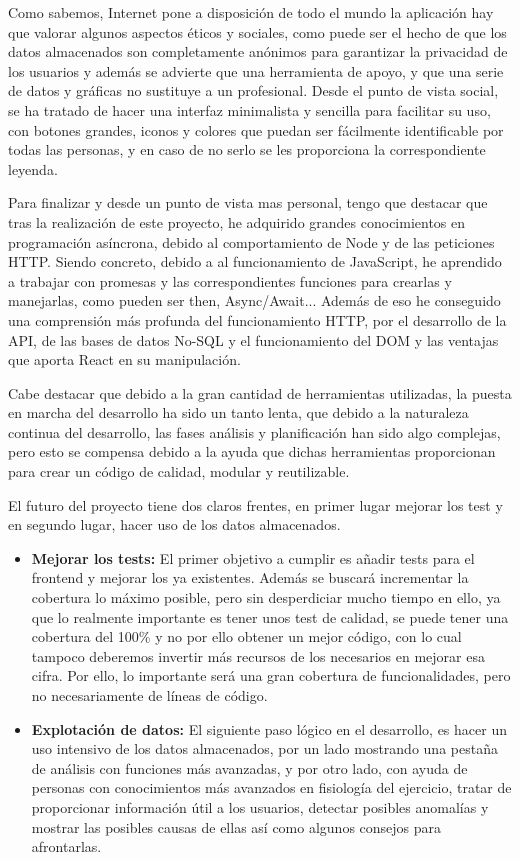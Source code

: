 Como sabemos, Internet pone a disposición de todo el mundo la aplicación hay que valorar algunos aspectos éticos y sociales, como puede ser el hecho de que los datos almacenados son completamente anónimos para garantizar la privacidad de los usuarios y además se advierte que una herramienta de apoyo, y que una serie de datos y gráficas no sustituye a un profesional. Desde el punto de vista social, se ha tratado de hacer una interfaz minimalista y sencilla para facilitar su uso, con botones grandes, iconos y colores que puedan ser fácilmente identificable por todas las personas, y en caso de no serlo se les proporciona la correspondiente leyenda.


Para finalizar y desde un punto de vista mas personal, tengo que destacar que tras la realización de este proyecto, he adquirido grandes conocimientos en programación asíncrona, debido al comportamiento de Node y de las peticiones HTTP. Siendo concreto, debido a al funcionamiento de JavaScript, he aprendido a trabajar con promesas y las correspondientes funciones para crearlas y manejarlas, como pueden ser then, Async/Await... Además de eso he conseguido una comprensión más profunda del funcionamiento HTTP, por el desarrollo de la API, de las bases de datos No-SQL y el funcionamiento del DOM y las ventajas que aporta React en su manipulación.

Cabe destacar que debido a la gran cantidad de herramientas utilizadas, la puesta en marcha del desarrollo ha sido un tanto lenta, que debido a la naturaleza continua del desarrollo, las fases análisis y planificación han sido algo complejas, pero esto se compensa debido a la ayuda que dichas herramientas proporcionan para crear un código de calidad, modular y reutilizable.

El futuro del proyecto tiene dos claros frentes, en primer lugar mejorar los test y en segundo lugar, hacer uso de los datos almacenados.
\begin{itemize}
  \item \textbf{Mejorar los tests: } El primer objetivo a cumplir es añadir tests para el frontend y mejorar los ya existentes. Además se buscará incrementar la cobertura lo máximo posible, pero sin desperdiciar mucho tiempo en ello, ya que lo realmente importante es tener unos test de calidad, se puede tener una cobertura del 100\% y no por ello obtener un mejor código, con lo cual tampoco deberemos invertir más recursos de los necesarios en mejorar esa cifra. Por ello, lo importante será una gran cobertura de funcionalidades, pero no necesariamente de líneas de código.
  \item \textbf{Explotación de datos: } El siguiente paso lógico en el desarrollo, es hacer un uso intensivo de los datos almacenados, por un lado mostrando una pestaña de análisis con funciones más avanzadas, y por otro lado, con ayuda de personas con conocimientos más avanzados en fisiología del ejercicio, tratar de proporcionar información útil a los usuarios, detectar posibles anomalías y mostrar las posibles causas de ellas así como algunos consejos para afrontarlas.
\end{itemize}

